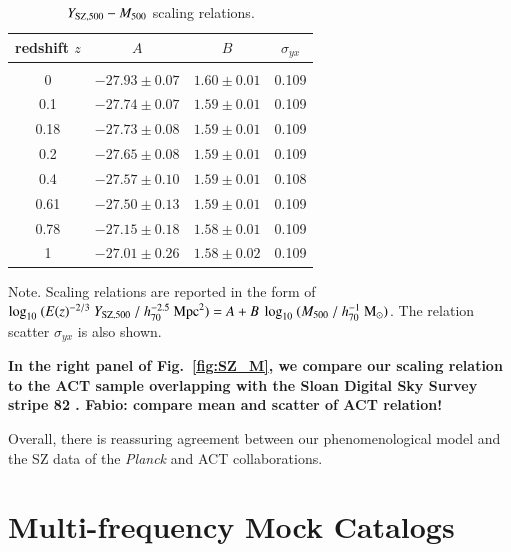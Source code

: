 \documentclass[useAMS,usenatbib]{mn2e}
\newcommand\qc[1]{{\color{red} \bf #1}}
\begin{document}
\begin{table} 
\begin{center}
\caption{$Y_{{\mathrm{SZ}}, 500}-M_{500}$ scaling relations.}
\medskip
\begin{tabular}{cccc}
\hline
\phantom{\Big|}
redshift $z$ & $A$ & $B$ & $\sigma_{yx}$ \\
\hline\\[-0.5em]
 0      & $-27.93\pm0.07$ & $1.60\pm0.01$ & 0.109\\
 0.1   & $-27.74\pm0.07$ & $1.59\pm0.01$ & 0.109\\
 0.18 & $-27.73\pm0.08$ & $1.59\pm0.01$ & 0.109\\
 0.2   & $-27.65\pm0.08$ & $1.59\pm0.01$ & 0.109\\ 
 0.4   & $-27.57\pm0.10$ & $1.59\pm0.01$ & 0.108\\ 
 0.61 & $-27.50\pm0.13$ & $1.59\pm0.01$ & 0.109\\ 
 0.78 & $-27.15\pm0.18$ & $1.58\pm0.01$ & 0.109\\ 
 1      & $-27.01\pm0.26$ & $1.58\pm0.02$ & 0.109\\[0.5em] 
\hline
\end{tabular}
\label{tab:YSZfits}
\end{center}
\footnotesize{Note. Scaling relations are reported in the form of $\log_{10}~(E(z)^{-2/3}~Y_{{\mathrm{SZ}},500}~/~h_{70}^{-2.5}~{\mathrm{Mpc}}^{2})=A+B~\log_{10}~(M_{500}~/~h_{70}^{-1}~{\mathrm{M_{\odot}}})$. The relation scatter $\sigma_{yx}$ is also shown.}
\end{table}

{\bf In the right panel of Fig.~\ref{fig:SZ_M}, we compare our scaling relation
  to the ACT sample overlapping with the Sloan Digital Sky Survey stripe 82
  \citep{2013JCAP...07..008H}. \qc{Fabio: compare mean and scatter of ACT relation!}

  Overall, there is reassuring agreement between our phenomenological model and
  the SZ data of the \emph{Planck} and ACT collaborations.  }
 

\section{Multi-frequency Mock Catalogs}
\label{sec:6}
\end{document}
